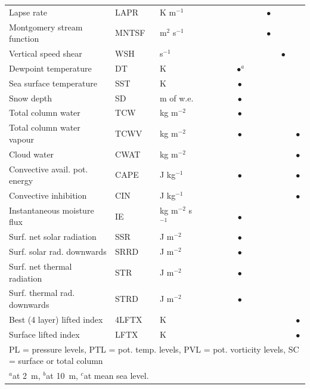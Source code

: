 \documentclass[draft]{agujournal2019}
\begin{document}
\begin{table}
{\begin{tabular}{lll|cccc|cccc}
		Lapse rate & LAPR & K m$^{-1}$ &  &  &  &  &  & $\bullet$ &  &  \\
		Montgomery stream function & MNTSF & m$^{2}$ s$^{-1}$ &  &  &  &  &  & $\bullet$ &  &  \\
		Vertical speed shear & WSH & s$^{-1}$ &  &  &  &  &  &  & $\bullet$ &  \\
		Dewpoint temperature & DT & K &  &  &  & $^{\ }\bullet^{a}$ &  &  &  &  \\
		Sea surface temperature & SST & K &  &  &  & $\bullet$ &  &  &  &  \\
		Snow depth & SD & m of w.e. &  &  &  & $\bullet$ &  &  &  &  \\
		Total column water & TCW & kg m$^{-2}$ &  &  &  & $\bullet$ &  &  &  &  \\
		Total column water vapour & TCWV & kg m$^{-2}$ &  &  &  & $\bullet$ &  &  &  & $\bullet$ \\
		Cloud water & CWAT & kg m$^{-2}$ &  &  &  &  &  &  &  & $\bullet$ \\
		Convective avail. pot. energy & CAPE & J kg$^{-1}$ &  &  &  & $\bullet$ &  &  &  & $\bullet$ \\
		Convective inhibition & CIN & J kg$^{-1}$ &  &  &  &  &  &  &  & $\bullet$ \\
		Instantaneous moisture flux & IE & kg m$^{-2}$ s$^{-1}$ &  &  &  & $\bullet$ &  &  &  &  \\
		Surf. net solar radiation & SSR & J m$^{-2}$ &  &  &  & $\bullet$ &  &  &  &  \\
		Surf. solar rad. downwards & SRRD & J m$^{-2}$ &  &  &  & $\bullet$ &  &  &  &  \\
		Surf. net thermal radiation & STR & J m$^{-2}$ &  &  &  & $\bullet$ &  &  &  &  \\
		Surf. thermal rad. downwards & STRD & J m$^{-2}$ &  &  &  & $\bullet$ &  &  &  &  \\
		Best (4 layer) lifted index & 4LFTX & K &  &  &  &  &  &  &  & $\bullet$ \\
		Surface lifted index & LFTX & K &  &  &  &  &  &  &  & $\bullet$ \\
		\hline
		\multicolumn{11}{l}{PL = pressure levels, PTL = pot. temp. levels, PVL = pot. vorticity levels, SC = surface or total column}\\
		\multicolumn{11}{l}{$^{a}$at 2~m, $^{b}$at 10~m, $^{c}$at mean sea level.}\\
		\hline 
	\end{tabular}}
	\label{list_variables}
\end{table}
\end{document}
